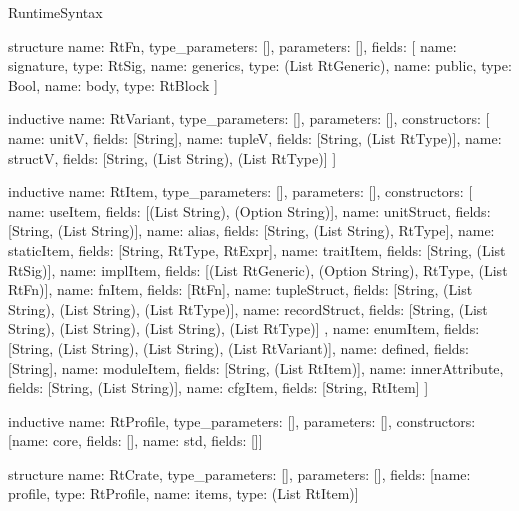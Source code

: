 \begin{lexlean}{RuntimeSyntax}
\begin{semanticmodule}
structure{
  name: RtFn,
  type_parameters: [],
  parameters: [],
  fields: [
    {name: signature, type: RtSig},
    {name: generics, type: (List RtGeneric)},
    {name: public, type: Bool},
    {name: body, type: RtBlock}
  ]
}

inductive{
  name: RtVariant,
  type_parameters: [],
  parameters: [],
  constructors: [
    {name: unitV, fields: [String]},
    {name: tupleV, fields: [String, (List RtType)]},
    {name: structV, fields: [String, (List String), (List RtType)]}
  ]
}

inductive{
  name: RtItem,
  type_parameters: [],
  parameters: [],
  constructors: [
    {name: useItem, fields: [(List String), (Option String)]},
    {name: unitStruct, fields: [String, (List String)]},
    {name: alias, fields: [String, (List String), RtType]},
    {name: staticItem, fields: [String, RtType, RtExpr]},
    {name: traitItem, fields: [String, (List RtSig)]},
    {name: implItem, fields: [(List RtGeneric), (Option String), RtType, (List RtFn)]},
    {name: fnItem, fields: [RtFn]},
    {name: tupleStruct, fields: [String, (List String), (List String), (List RtType)]},
    {
      name: recordStruct,
      fields: [String, (List String), (List String), (List String), (List RtType)]
    },
    {name: enumItem, fields: [String, (List String), (List String), (List RtVariant)]},
    {name: defined, fields: [String]},
    {name: moduleItem, fields: [String, (List RtItem)]},
    {name: innerAttribute, fields: [String, (List String)]},
    {name: cfgItem, fields: [String, RtItem]}
  ]
}

inductive{
  name: RtProfile,
  type_parameters: [],
  parameters: [],
  constructors: [{name: core, fields: []}, {name: std, fields: []}]
}

structure{
  name: RtCrate,
  type_parameters: [],
  parameters: [],
  fields: [{name: profile, type: RtProfile}, {name: items, type: (List RtItem)}]
}
\end{semanticmodule}
\end{lexlean}
